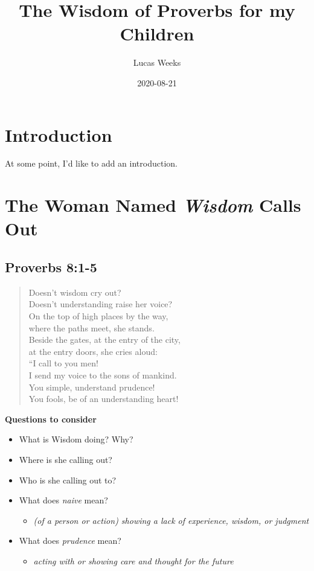 \documentclass[
]{book}
\title{The Wisdom of Proverbs for my Children}
\author{Lucas Weeks}
\date{2020-08-21}
\providecommand{\tightlist}{%
  \setlength{\itemsep}{0pt}\setlength{\parskip}{0pt}}
\begin{document}
\maketitle

{
\setcounter{tocdepth}{1}
\tableofcontents
}
\hypertarget{introduction}{%
\chapter{Introduction}\label{introduction}}

At some point, I'd like to add an introduction.

\hypertarget{the-woman-named-wisdom-calls-out}{%
\chapter{\texorpdfstring{The Woman Named \emph{Wisdom} Calls Out}{The Woman Named Wisdom Calls Out}}\label{the-woman-named-wisdom-calls-out}}

\hypertarget{proverbs-81-5}{%
\section{Proverbs 8:1-5}\label{proverbs-81-5}}

\begin{quote}
Doesn't wisdom cry out?\\
Doesn't understanding raise her voice?\\
On the top of high places by the way,\\
where the paths meet, she stands.\\
Beside the gates, at the entry of the city,\\
at the entry doors, she cries aloud:\\
``I call to you men!\\
I send my voice to the sons of mankind.\\
You simple, understand prudence!\\
You fools, be of an understanding heart!
\end{quote}

\textbf{Questions to consider}

\begin{itemize}
\tightlist
\item
  What is Wisdom doing? Why?
\item
  Where is she calling out?
\item
  Who is she calling out to?
\item
  What does \emph{naive} mean?

  \begin{itemize}
  \tightlist
  \item
    \emph{(of a person or action) showing a lack of experience, wisdom, or judgment}
  \end{itemize}
\item
  What does \emph{prudence} mean?

  \begin{itemize}
  \tightlist
  \item
    \emph{acting with or showing care and thought for the future}
  \end{itemize}
\end{itemize}
\end{document}
